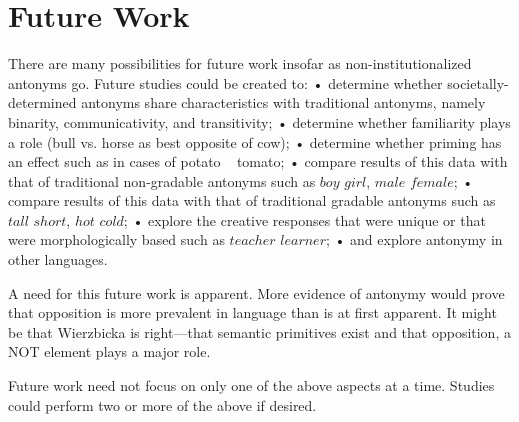\section {Future Work}
There are many possibilities for future work insofar as non-institutionalized antonyms go.  Future studies could be created to:
	•	determine whether societally-determined antonyms share characteristics with traditional antonyms, namely binarity, communicativity, and transitivity;
	•	determine whether familiarity plays a role (bull vs. horse as best opposite of cow);
	•	determine whether priming has an effect such as in cases of potato ~ tomato;
	•	compare results of this data with that of traditional non-gradable antonyms such as $boy$ \opp $girl$, $male$ \opp $female$;
	•	compare results of this data with that of traditional gradable antonyms such as $tall$ \opp $short$, $hot$ \opp $cold$;
	•	explore the creative responses that were unique or that were morphologically based such as $teacher$ \opp $learner$;
	•	and explore antonymy in other languages.  

A need for this future work is apparent.  More evidence of antonymy would prove that opposition is more prevalent in language than is at first apparent.  It might be that Wierzbicka is right—that semantic primitives exist and that opposition, a NOT element plays a major role.

Future work need not focus on only one of the above aspects at a time.  Studies could perform two or more of the above if desired.

